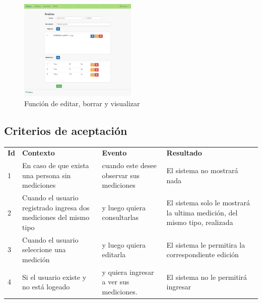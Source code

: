 \documentclass[a4paper,12pt]{article}
\begin{document}
    \begin{figure}[h]
        \centering
        \includegraphics[width=0.5\textwidth]{img/5-mediciones_cargadas}
        \caption{Función de editar, borrar y visualizar}
		\label{5-mediciones_cargadas}
    \end{figure}


\clearpage

\subsection{Criterios de aceptación}

\begin{center}
\begin{longtable}{|p{0.5cm}|p{4cm}|p{4cm}|p{5cm}|}
\hline \hline \rowcolor[gray]{0.9}
	\multicolumn{4}{||c|}{\textbf{Criterio de aceptación}} \\
    \hline  \rowcolor[gray]{0.9}
        \textbf{Id} &
        \textbf{Contexto} &
        \textbf{Evento}&
        \textbf{Resultado} \\
    \hline
1&En caso de que exista una persona sin mediciones & cuando este desee observar sus mediciones  & El sistema no mostrará nada \\ \hline
 
2& Cuando el usuario registrado ingresa dos mediciones del mismo tipo  & y luego quiera consultarlas & El sistema solo le mostrará la ultima medición, del mismo tipo, realizada\\ \hline

3& Cuando el usuario seleccione una medición & y luego quiera editarla & El sistema le permitira la correspondiente edición\\ \hline

4& Si el usuario existe y no está logeado & y quiera ingresar a ver sus mediciones. & El sistema no le permitirá ingresar\\ \hline
  \end{longtable}
\end{center}
\end{document}
